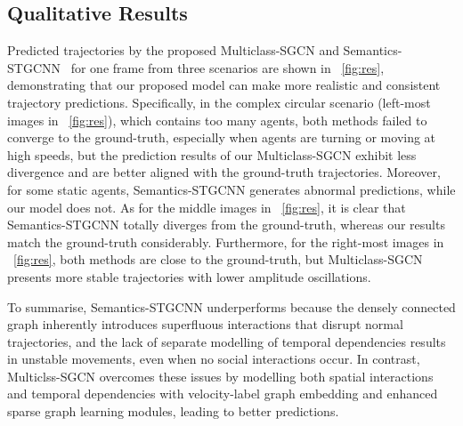 \documentclass{article}
\begin{document}
\subsection{Qualitative Results}

Predicted trajectories by the proposed Multiclass-SGCN and Semantics-STGCNN~\cite{rainbow2021semanticsstgcnn} for one frame from three scenarios are shown in \figurename~\ref{fig:res}, demonstrating that our proposed model can make more realistic and consistent trajectory predictions.
Specifically, in the complex circular scenario (left-most images in \figurename~\ref{fig:res}), which contains too many agents, both methods failed to converge to the ground-truth, especially when agents are turning or moving at high speeds, but the prediction results of our Multiclass-SGCN exhibit less divergence and are better aligned with the ground-truth trajectories. Moreover, for some static agents, Semantics-STGCNN generates abnormal predictions, while our model does not. 
As for the middle images in \figurename~\ref{fig:res}, it is clear that Semantics-STGCNN totally diverges from the ground-truth, whereas our results match the ground-truth considerably.
Furthermore, for the right-most images in \figurename~\ref{fig:res}, both methods are close to the ground-truth, but Multiclass-SGCN presents more stable trajectories with lower amplitude oscillations.

To summarise, Semantics-STGCNN underperforms because the densely connected graph inherently introduces superfluous interactions that disrupt normal trajectories, and the lack of separate modelling of temporal dependencies results in unstable movements, even when no social interactions occur. In contrast, Multiclss-SGCN overcomes these issues by modelling both spatial interactions and temporal dependencies with velocity-label graph embedding and enhanced sparse graph learning modules, leading to better predictions.
\end{document}
